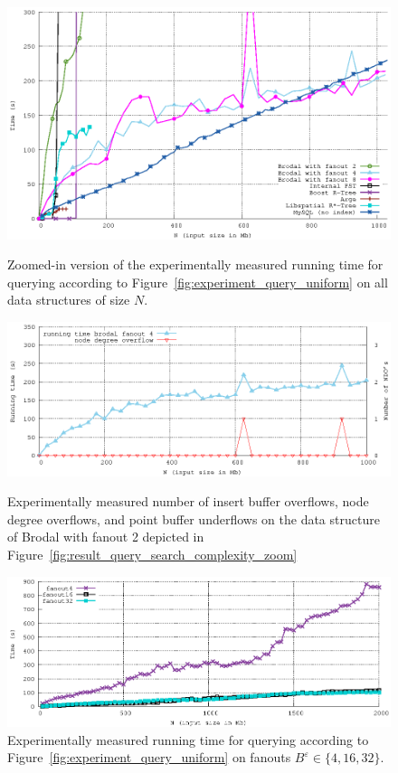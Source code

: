\documentclass[twoside,11pt,openright]{report}
\def \epsilon {\varepsilon}
\begin{document}
\begin{figure}[h]
\centering
\includegraphics[width=\textwidth]{../src/experiments/query_experiment_results/final2/time_zoom}
\caption{Zoomed-in version of the experimentally measured running time for querying according to Figure~\ref{fig:experiment_query_uniform} on all data structures of size $N$.}
\label{fig:result_query_search_complexity_zoom}
\includegraphics[width=\textwidth]{../src/experiments/query_experiment_results/final2/all_operations2}
\caption{Experimentally measured number of insert buffer overflows, node degree overflows, and point buffer underflows on the data structure of Brodal with fanout 2 depicted in Figure~\ref{fig:result_query_search_complexity_zoom}}
\label{fig:result_query_search_fixup}
\includegraphics[width=\textwidth]{../src/experiments/gerth_query_fanout_experiment_results/2016-05-19.19_04_49/time}
\caption{Experimentally measured running time for querying according to Figure~\ref{fig:experiment_query_uniform} on fanouts $B^\epsilon \in \{4, 16, 32 \}$.}
\label{fig:gerth_query_fanout_experiment}
\end{figure}
\end{document}
